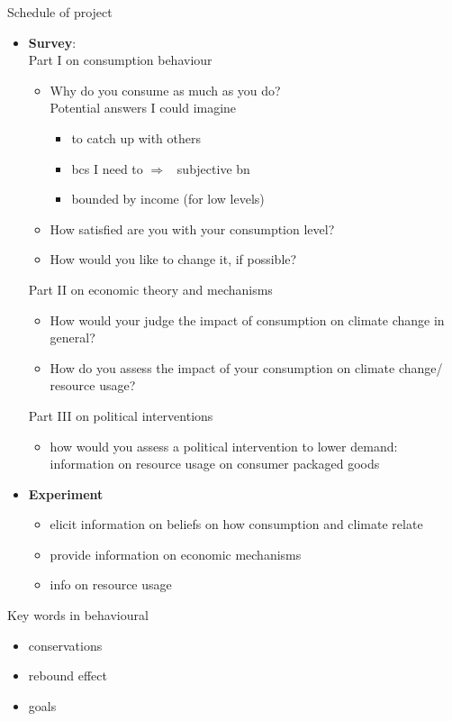 \documentclass[12pt]{article}
\newcommand{\ar}{$\Rightarrow$ \ }
\begin{document}
Schedule of project
\begin{itemize}
	\item \textbf{Survey}:
	\\ Part I on consumption behaviour
	\begin{itemize}
	\item  Why do you consume as much as you do?
	\\ Potential answers I could imagine
	\begin{itemize}
		\item to catch up with others
		\item bcs I need to \ar subjective bn
		\item bounded by income (for low levels)
	\end{itemize}
	\item How satisfied are you with your consumption level?
	\item How would you like to change it, if possible?
\end{itemize}
Part II on economic theory and mechanisms
\begin{itemize}
	\item How would your judge the impact of consumption on climate change in general?
	\item How do you assess the impact of your consumption on climate change/ resource usage?
\end{itemize}
Part III on political interventions
\begin{itemize}
	\item how would you assess a political intervention to lower demand: information on resource usage on consumer packaged goods
\end{itemize}
\item \textbf{Experiment}
\begin{itemize}
	\item elicit information on beliefs on how consumption and climate relate
	\item provide information on economic mechanisms
	\item info on resource usage 
\end{itemize}
\end{itemize}

Key words in behavioural
\begin{itemize}
	\item conservations
	\item rebound effect
	\item goals
\end{itemize}

\clearpage

\end{document}

